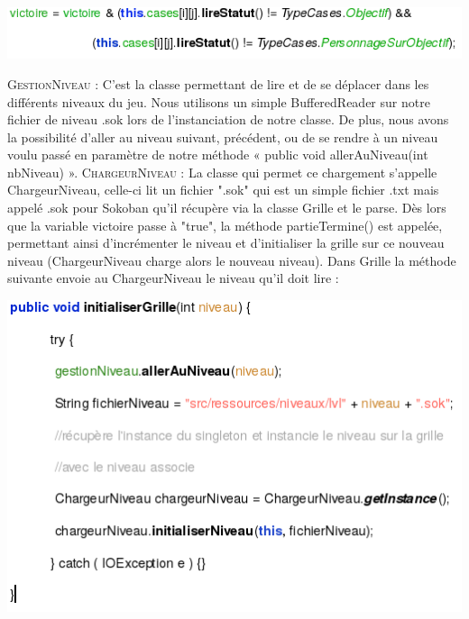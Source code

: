 \documentclass[a4paper,12pt]{article} %
\begin{document}
\begin{center} \includegraphics[scale=1]{code1.png} \end{center}
\newpage
\noindent
\textsc{GestionNiveau :}
\newline\newline
C'est la classe permettant de lire et de se déplacer dans les différents niveaux du jeu.
Nous utilisons un simple BufferedReader sur notre fichier de niveau .sok lors de l’instanciation de notre classe.
De plus, nous avons la possibilité d’aller au niveau suivant, précédent, ou de se rendre à un niveau voulu passé en paramètre de notre méthode « public void allerAuNiveau(int nbNiveau) ».
\noindent
\newline\newline
\textsc{ChargeurNiveau :}
\newline\newline
La classe qui permet ce chargement s’appelle ChargeurNiveau, celle-ci lit un fichier ".sok" qui est un simple fichier .txt mais appelé .sok pour Sokoban qu’il récupère via la classe Grille et le parse. Dès lors que la variable victoire passe à "true", la méthode partieTermine() est appelée, permettant ainsi d’incrémenter le niveau et d’initialiser la grille sur ce nouveau niveau (ChargeurNiveau charge alors le nouveau niveau).
\newline
Dans Grille la méthode suivante envoie au ChargeurNiveau le niveau qu’il doit lire :
\newline
\begin{center} \includegraphics[scale=1]{code2.png} \end{center}
\end{document}
